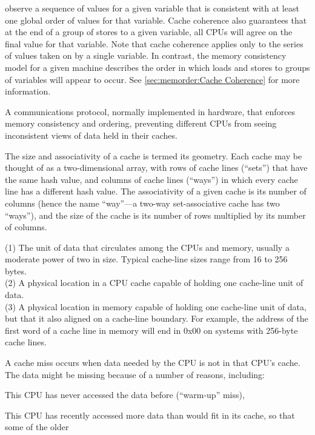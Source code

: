 \begin{description}
	observe a sequence of values for a given variable that is
	consistent with at least one global order of values for
	that variable.
	Cache coherence also guarantees that at the end of a group
	of stores to a given variable, all CPUs will agree
	on the final value for that variable.
	Note that cache coherence applies only to the series of values
	taken on by a single variable.
	In contrast, the memory consistency model for a given machine
	describes the order in which loads and stores to groups of
	variables will appear to occur.
	See \cref{sec:memorder:Cache Coherence}
	for more information.
\item[\IXG{Cache-Coherence Protocol}:]
	A communications protocol, normally implemented in hardware,
	that enforces memory consistency and ordering, preventing
	different CPUs from seeing inconsistent views of data held
	in their caches.
\item[\IXG{Cache Geometry}:]
	The size and associativity of a cache is termed its geometry.
	Each cache may be thought of as a two-dimensional array,
	with rows of cache lines (``sets'') that have the same hash
	value, and columns of cache lines (``ways'') in which every
	cache line has a different hash value.
	The associativity of a given cache is its number of
	columns (hence the name ``way''---a two-way set-associative
	cache has two ``ways''), and the size of the cache is its
	number of rows multiplied by its number of columns.
\item[\IXG{Cache Line}:]
	(1) The unit of data that circulates among the CPUs and memory,
	usually a moderate power of two in size.
	Typical cache-line sizes range from 16 to 256 bytes. \\
	(2) A physical location in a CPU cache capable of holding
	one cache-line unit of data. \\
	(3) A physical location in memory capable of holding one
	cache-line unit of data, but that it also aligned
	on a cache-line boundary.
	For example, the address of the first word of a cache line
	in memory will end in 0x00 on systems with 256-byte cache lines.
\item[\IXG{Cache Miss}:]
	A cache miss occurs when data needed by the CPU is not in
	that CPU's cache.
	The data might be missing because of a number of reasons,
	including:
	\begin{enumerate*}[(1)]
	\item This CPU has never accessed the data before
	(``warm-up'' miss),
	\item This CPU has recently accessed more
	data than would fit in its cache, so that some of the older

\end{enumerate*}
\end{description}
